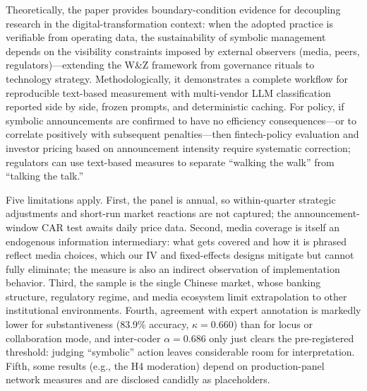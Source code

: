 Theoretically, the paper provides boundary-condition evidence for decoupling
research in the digital-transformation context: when the adopted practice is
verifiable from operating data, the sustainability of symbolic management
depends on the visibility constraints imposed by external observers (media,
peers, regulators)---extending the W\&Z framework from governance rituals to
technology strategy. Methodologically, it demonstrates a complete workflow
for reproducible text-based measurement with multi-vendor LLM classification
reported side by side, frozen prompts, and deterministic caching. For
policy, if symbolic announcements are confirmed to have no efficiency
consequences---or to correlate positively with subsequent penalties---then
fintech-policy evaluation and investor pricing based on announcement
intensity require systematic correction; regulators can use text-based
measures to separate ``walking the walk'' from ``talking the talk.''

Five limitations apply. First, the panel is annual, so within-quarter
strategic adjustments and short-run market reactions are not captured; the
announcement-window CAR test awaits daily price data. Second, media coverage
is itself an endogenous information intermediary: what gets covered and how
it is phrased reflect media choices, which our IV and fixed-effects designs
mitigate but cannot fully eliminate; the measure is also an indirect
observation of implementation behavior. Third, the sample is the single
Chinese market, whose banking structure, regulatory regime, and media
ecosystem limit extrapolation to other institutional environments. Fourth,
agreement with expert annotation is markedly lower for substantiveness
(83.9\% accuracy, $\kappa = 0.660$) than for locus or collaboration mode,
and inter-coder $\alpha = 0.686$ only just clears the pre-registered
threshold: judging ``symbolic'' action leaves considerable room for
interpretation. Fifth, some results (e.g., the H4
moderation) depend on production-panel network measures and are disclosed
candidly as placeholders.

\printbibliography


